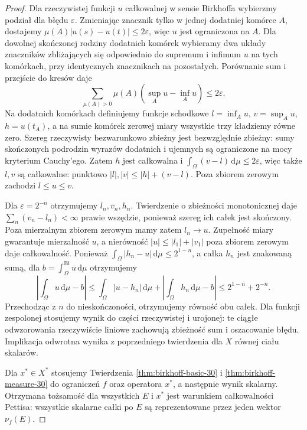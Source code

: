 \begin{proof}
Dla rzeczywistej funkcji $u$ całkowalnej w sensie Birkhoffa
wybierzmy podział dla błędu $\varepsilon$.
Zmieniając znacznik tylko w jednej dodatniej komórce $A$,
dostajemy $\mu(A)|u(s)-u(t)|\le2\varepsilon$,
więc $u$ jest ograniczona na $A$.
Dla dowolnej skończonej rodziny dodatnich komórek
wybieramy dwa układy znaczników zbliżających się
odpowiednio do supremum i infimum $u$ na tych komórkach,
przy identycznych znacznikach na pozostałych.
Porównanie sum i przejście do kresów daje
\[
 \sum_{\mu(A)>0}\mu(A)(\sup_Au-\inf_Au)\le2\varepsilon.
\]
Na dodatnich komórkach definiujemy funkcje schodkowe
$l=\inf_Au$, $v=\sup_Au$, $h=u(t_A)$, a na sumie
komórek zerowej miary wszystkie trzy kładziemy równe zero.
Szereg rzeczywisty bezwarunkowo zbieżny jest bezwzględnie
zbieżny: sumy skończonych podrodzin wyrazów dodatnich
i ujemnych są ograniczone na mocy kryterium Cauchy'ego.
Zatem $h$ jest całkowalna i
$\int_\Omega(v-l)\,\mathrm d\mu\le2\varepsilon$,
więc także $l,v$ są całkowalne: punktowo
$|l|,|v|\le |h|+(v-l)$.
Poza zbiorem zerowym zachodzi $l\le u\le v$.

Dla $\varepsilon=2^{-n}$ otrzymujemy $l_n,v_n,h_n$.
Twierdzenie o zbieżności monotonicznej daje
$\sum_n(v_n-l_n)<\infty$ prawie wszędzie, ponieważ
szereg ich całek jest skończony. Poza mierzalnym
zbiorem zerowym mamy zatem $l_n\to u$.
Zupełność miary gwarantuje mierzalność $u$,
a nierówność $|u|\le |l_1|+|v_1|$ poza
zbiorem zerowym daje całkowalność.
Ponieważ $\int_\Omega|h_n-u|\,\mathrm d\mu\le2^{1-n}$,
a całka $h_n$ jest znakowaną sumą, dla
$b=\int_\Omega^{\mathrm{Bi}}u\,\mathrm d\mu$ otrzymujemy
\[
 \left|\int_\Omega u\,\mathrm d\mu-b\right|
 \le\int_\Omega|u-h_n|\,\mathrm d\mu
       +\left|\int_\Omega h_n\,\mathrm d\mu-b\right|
 \le 2^{1-n}+2^{-n}.
\]
Przechodząc z $n$ do nieskończoności, otrzymujemy
równość obu całek. Dla funkcji zespolonej stosujemy wynik
do części rzeczywistej i urojonej: te ciągłe
odwzorowania rzeczywiście liniowe zachowują
zbieżność sum i oszacowanie błędu.
Implikacja odwrotna wynika z poprzedniego twierdzenia
dla $X$ równej ciału skalarów.

Dla $x^*\in X^*$ stosujemy Twierdzenia
\ref{thm:birkhoff-basic-30} i \ref{thm:birkhoff-measure-30}
do ograniczeń $f$ oraz operatora $x^*$, a następnie
wynik skalarny. Otrzymana tożsamość dla wszystkich
$E$ i $x^*$ jest warunkiem całkowalności Pettisa:
wszystkie skalarne całki po $E$ są reprezentowane
przez jeden wektor $\nu_f(E)$.
\end{proof}

